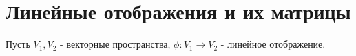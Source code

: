 \section{Линейные отображения и их матрицы}
    Пусть $V_1, V_2$ - векторные пространства, $\phi: V_1 \rightarrow V_2$ - линейное отображение.
